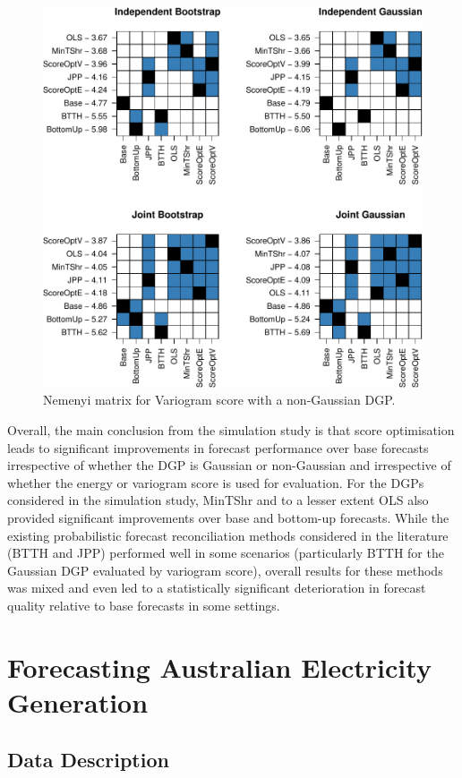 \documentclass[11pt]{article}
\theoremstyle{definition}
\begin{document}
\begin{figure}[H]
	\centering
	\includegraphics[width=.75\textwidth]{Figs/nsv.pdf}
	\caption{Nemenyi matrix for Variogram score with a non-Gaussian DGP.}
	\label{fig:nsv}
\end{figure}

Overall, the main conclusion from the simulation study is that score optimisation leads to significant improvements in forecast performance over base forecasts irrespective of whether the DGP is Gaussian or non-Gaussian and irrespective of whether the energy or variogram score is used for evaluation. For the DGPs considered in the simulation study, MinTShr and to a lesser extent OLS also provided significant improvements over base and bottom-up forecasts. While the existing probabilistic forecast reconciliation methods considered in the literature (BTTH and JPP) performed well in some scenarios (particularly BTTH for the Gaussian DGP evaluated by variogram score), overall results for these methods was mixed and even led to a statistically significant deterioration in forecast quality relative to base forecasts in some settings.

\section{Forecasting Australian Electricity Generation}\label{sec:Application}

\subsection{Data Description}\label{sec:datadesc}
\end{document}
